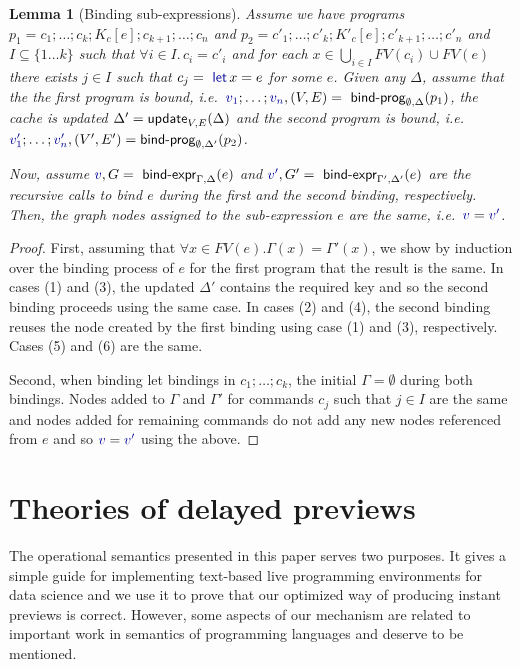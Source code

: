 \documentclass[english,crc]{programming}
\newcounter{thc}
\theoremstyle{plain}
\newtheorem{lem}[thc]{Lemma}
\theoremstyle{definition}
\newcommand{\ident}[1]{\textnormal{\textcolor{idclr}{\sffamily #1}}}
\newcommand{\kvd}[1]{\textnormal{\textcolor{kvdclr}{\sffamily #1}}}
\newcommand{\bndclr}[1]{\textcolor{kvdclr}{#1}}
\begin{document}
\begin{lem}[Binding sub-expressions]
\label{thm:sub-expr}
Assume we have programs $p_1 = c_1; \ldots; c_k; K_c[e]; c_{k+1};\ldots; c_n$ and
$p_2 = c'_1; \ldots; c'_k; K'_c[e]; c'_{k+1};\ldots;c'_n$ and $I\subseteq \{1\ldots k\}$ such
that $\forall i\!\in\!I.\,c_i\!=\!c'_i$ and for each $x \in \bigcup_{i\in I}FV(c_i) \cup FV(e)$
there exists $j\in I$ such that $c_j = \kvd{let}\,x=e$ for some $e$.
%
Given any $\Delta$, assume that the the first program is bound,
i.e.~$\bndclr{v_1};\ldots;\bndclr{v_n}, (V, E) = \ident{bind-prog}_{\emptyset, \Delta}(p_1)$,
the cache is updated $\Delta' = \ident{update}_{V, E}(\Delta)$ and the second
program is bound,
i.e.~$\bndclr{v'_1};\ldots;\bndclr{v'_n}, (V', E') = \ident{bind-prog}_{\emptyset, \Delta'}(p_2)$.

Now, assume $\bndclr{v}, G = \ident{bind-expr}_{\Gamma, \Delta}(e)$ and
$\bndclr{v'}, G' = \ident{bind-expr}_{\Gamma', \Delta'}(e)$ are the recursive calls to bind
$e$ during the first and the second binding, respectively. Then, the graph nodes assigned to the
sub-expression $e$ are the same, i.e.~$\bndclr{v} = \bndclr{v'}$.
\end{lem}
\begin{proof}
First, assuming that $\forall x\in FV(e). \Gamma(x) = \Gamma'(x)$, we show by induction over the binding process of $e$
for the first program that the result is the same. In cases (1) and (3), the updated $\Delta'$
contains the required key and so the second binding proceeds using the same case. In cases
(2) and (4), the second binding reuses the node created by the first binding using case (1) and
(3), respectively. Cases (5) and (6) are the same.

Second, when binding let bindings in $c_1; \ldots; c_k$, the initial $\Gamma = \emptyset$ during
both bindings. Nodes added to $\Gamma$ and $\Gamma'$ for commands $c_j$ such that $j\in I$ are
the same and nodes added for remaining commands do not add any new nodes referenced from $e$ and
so $\bndclr{v} = \bndclr{v'}$ using the above.
\end{proof}



\section{Theories of delayed previews}
\label{sec:app-theories}

The operational semantics presented in this paper serves two purposes. It gives a simple guide
for implementing text-based live programming environments for data science and we use it to prove that
our optimized way of producing instant previews is correct. However, some aspects of our mechanism
are related to important work in semantics of programming languages and deserve to be mentioned.
\end{document}
